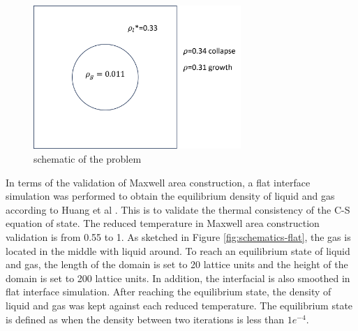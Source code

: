 \documentclass[review]{elsarticle}
\begin{document}
\begin{figure}[htp]
	\centering
	\includegraphics[width=0.7\textwidth]{schematic}
	\caption{schematic of the problem}
	\label{fig:schematics}
\end{figure}
In terms of the validation of Maxwell area construction, a flat interface simulation was performed to obtain the equilibrium density of liquid and gas according to Huang et al \cite{huang2019thermodynamic}. This is to validate the thermal consistency of the C-S equation of state. The reduced temperature in Maxwell area construction validation is from 0.55 to 1. As sketched in Figure \ref{fig:schematics-flat}, the gas is located in the middle with liquid around. To reach an equilibrium state of liquid and gas, the length of the domain is set to 20 lattice units and the height of the domain is set to 200 lattice units. In addition, the interfacial is also smoothed in flat interface simulation. After reaching the equilibrium state, the density of liquid and gas was kept against each reduced temperature. The equilibrium state is defined as when the density between two iterations is less than $1e^{-4}$.  
\end{document}

